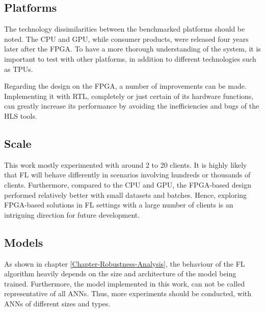 \subsection{Platforms}
The technology dissimilarities between the benchmarked platforms should be noted. The CPU and GPU, while consumer products, were released four years later after the FPGA. To have a more thorough understanding of the system, it is important to test with other platforms, in addition to different technologies such as TPUs.

Regarding the design on the FPGA, a number of improvements can be made. Implementing it with RTL, completely or just certain of its hardware functions, can greatly increase its performance by avoiding the inefficiencies and bugs of the HLS tools.

\subsection{Scale}
This work mostly experimented with around 2 to 20 clients. It is highly likely that FL will behave differently in scenarios involving hundreds or thousands of clients. Furthermore, compared to the CPU and GPU, the FPGA-based design performed relatively better with small datasets and batches. Hence, exploring FPGA-based solutions in FL settings with a large number of clients is an intriguing direction for future development.

\subsection{Models}
As shown in chapter \ref{Chapter-Robustness-Analysis}, the behaviour of the FL algorithm heavily depends on the size and architecture of the model being trained. Furthermore, the model implemented in this work, can not be called representative of all ANNs.  Thus, more experiments should be conducted, with ANNs of different sizes and types.